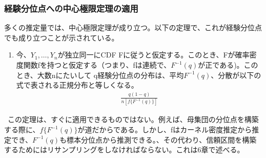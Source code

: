 \documentclass[dvipdfmx,autodetect-engine]{jsarticle}
\begin{document}
\subsubsection{経験分位点への中心極限定理の適用}
多くの推定量では、中心極限定理が成り立つ。以下の定理で、これが経験分位点でも成り立つことが示されている。
\begin{enumerate}[label = 結果4.\arabic*]
\item 今、$Y_{1},\ldots,Y_{n}$が独立同一にCDF Fに従うと仮定する。このとき、Fが確率密度関数fを持つと仮定する（つまり、fは連続で、$F^{-1}(q)$が正である)。このとき、大数nにたいして
q経験分位点の分布は、平均$F^{-1}(q)$、分散が以下の式で表される正規分布と等しくなる。
\begin{align}
\frac{q(1-q)}{n[f\{F^{-1}(q)\}]}
\end{align}
\end{enumerate}
\ この定理は、すぐに適用できるものではない。例えば、母集団の分位点を構築する際に、$f\{F^{-1}(q)\}$が道だからである。しかし、fはカーネル密度推定から推定でき、$F^{-1}(q)$も標本分位点から推測できる。、その代わり、信頼区間を構築するためにはリサンプリングをしなければならない。これは6章で述べる。
\end{document}
